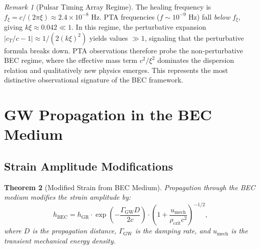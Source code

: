 \documentclass[11pt,a4paper]{article}
\newcommand{\rhocrit}{\ensuremath{\rho_{\mathrm{crit}}}}
\newcommand{\cT}{\ensuremath{c_T}}
\newcommand{\umech}{\ensuremath{u_{\mathrm{mech}}}}
\newtheorem{theorem}{Theorem}[section]
\theoremstyle{definition}
\theoremstyle{remark}
\newtheorem{remark}[theorem]{Remark}
\begin{document}
\begin{remark}[Pulsar Timing Array Regime]
The healing frequency is $f_\xi = c/(2\pi\xi) \approx 2.4 \times 10^{-8}$ Hz. PTA frequencies ($f \sim 10^{-9}$ Hz) fall \emph{below} $f_\xi$, giving $k\xi \approx 0.042 \ll 1$. In this regime, the perturbative expansion $|\cT/c - 1| \approx 1/(2(k\xi)^2)$ yields values $\gg 1$, signaling that the perturbative formula breaks down. PTA observations therefore probe the non-perturbative BEC regime, where the effective mass term $c^2/\xi^2$ dominates the dispersion relation and qualitatively new physics emerges. This represents the most distinctive observational signature of the BEC framework.
\end{remark}

\section{GW Propagation in the BEC Medium}
\label{sec:bec_effects}

\subsection{Strain Amplitude Modifications}
\label{sec:strain_amplitude}

\begin{theorem}[Modified Strain from BEC Medium]
\label{thm:strain_modification}
Propagation through the BEC medium modifies the strain amplitude by:
\begin{equation}
\label{eq:strain_modified}
\boxed{h_{\mathrm{BEC}} = h_{\mathrm{GR}} \cdot \exp\left(-\frac{\Gamma_{\mathrm{GW}} D}{2c}\right) \cdot \left(1 + \frac{\umech}{\rhocrit c^2}\right)^{-1/2},}
\end{equation}
where $D$ is the propagation distance, $\Gamma_{\mathrm{GW}}$ is the damping rate, and $\umech$ is the transient mechanical energy density.
\end{theorem}
\end{document}
